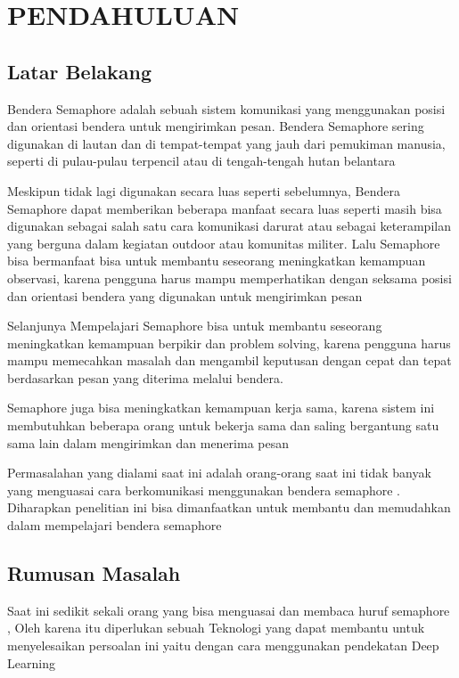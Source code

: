 \section{PENDAHULUAN}

\subsection{Latar Belakang}

Bendera Semaphore adalah sebuah sistem komunikasi yang menggunakan posisi dan orientasi bendera untuk mengirimkan pesan. Bendera Semaphore sering digunakan di lautan dan di tempat-tempat yang jauh dari pemukiman manusia, seperti di pulau-pulau terpencil atau di tengah-tengah hutan belantara

Meskipun tidak lagi digunakan secara luas seperti sebelumnya, Bendera Semaphore dapat memberikan beberapa manfaat secara luas seperti  masih bisa digunakan sebagai salah satu cara komunikasi darurat atau sebagai keterampilan yang berguna dalam kegiatan outdoor atau komunitas militer. Lalu Semaphore bisa bermanfaat bisa untuk membantu seseorang meningkatkan kemampuan observasi, karena pengguna harus mampu memperhatikan dengan seksama posisi dan orientasi bendera yang digunakan untuk mengirimkan pesan

Selanjunya Mempelajari Semaphore bisa untuk  membantu seseorang meningkatkan kemampuan berpikir dan problem solving, karena pengguna harus mampu memecahkan masalah dan mengambil keputusan dengan cepat dan tepat berdasarkan pesan yang diterima melalui bendera. 

Semaphore juga bisa meningkatkan kemampuan kerja sama, karena sistem ini membutuhkan beberapa orang untuk bekerja sama dan saling bergantung satu sama lain dalam mengirimkan dan menerima pesan

Permasalahan yang dialami saat ini adalah orang-orang saat ini tidak banyak yang menguasai cara berkomunikasi menggunakan bendera semaphore . Diharapkan penelitian ini bisa dimanfaatkan untuk membantu dan memudahkan dalam mempelajari bendera semaphore 


\subsection{Rumusan Masalah}

Saat ini sedikit sekali orang yang bisa menguasai dan membaca huruf semaphore , Oleh karena itu diperlukan sebuah Teknologi yang dapat membantu untuk menyelesaikan persoalan ini yaitu dengan cara menggunakan pendekatan Deep Learning 


